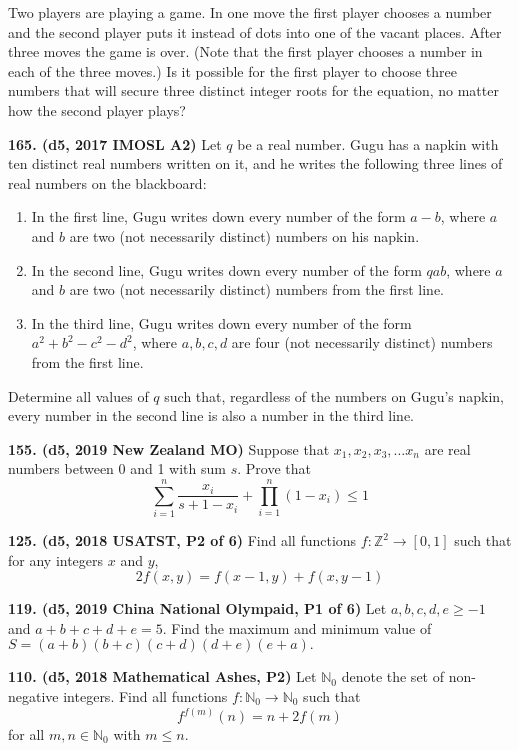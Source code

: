 \documentclass{article}
\begin{document}
Two players are playing a game. In one move the first player chooses a number and the second player puts it instead of dots into one of the vacant places. After three moves the game is over. (Note that the first player chooses a number in each of the three moves.) Is it possible for the first player to choose three numbers that will secure three distinct integer roots for the equation, no matter how the second player plays?

\textbf{165. (\color{red}d5\color{black}, 2017 IMOSL A2)} Let $q$ be a real number. Gugu has a napkin with ten distinct real numbers written on it, and he writes the following three lines of real numbers on the blackboard: \begin{enumerate} \item In the first line, Gugu writes down every number of the form $a-b$, where $a$ and $b$ are two (not necessarily distinct) numbers on his napkin. \item In the second line, Gugu writes down every number of the form $qab$, where $a$ and $b$ are two (not necessarily distinct) numbers from the first line. \item In the third line, Gugu writes down every number of the form $a^2+b^2-c^2-d^2$, where $a, b, c, d$ are four (not necessarily distinct) numbers from the first line. \end{enumerate}Determine all values of $q$ such that, regardless of the numbers on Gugu's napkin, every number in the second line is also a number in the third line.

\textbf{155. (\color{red}d5\color{black}, 2019 New Zealand MO)} Suppose that $x_1, x_2, x_3, \dots x_n$ are real numbers between 0 and 1 with sum $s$. Prove that \[\sum_{i=1}^n \frac{x_i}{s+1-x_i} + \prod_{i=1}^n (1-x_i) \leq 1\]

\textbf{125. (\color{red}d5\color{black}, 2018 USATST, P2 of 6)} Find all functions $f: \mathbb{Z}^2 \to [0, 1]$ such that for any integers $x$ and $y$, $$2f(x, y) = f(x - 1, y) + f(x, y - 1)$$

\textbf{119. (\color{red}d5\color{black}, 2019 China National Olympaid, P1 of 6)} Let \(a,b,c,d,e \geq -1\) and \(a+b+c+d+e=5.\) Find the maximum and minimum value of \(S=(a+b)(b+c)(c+d)(d+e)(e+a).\)

\textbf{110. (\color{red}d5\color{black}, 2018 Mathematical Ashes, P2)} Let \(\mathbb{N}_0\) denote the set of non-negative integers. Find all functions \(f:\mathbb{N}_0\to\mathbb{N}_0\) such that
\[f^{f(m)}(n) = n + 2f(m)\]
for all \(m,n \in \mathbb{N}_0\) with \(m \leq n\).
\end{document}
